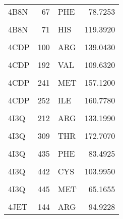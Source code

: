 \begin{table}
\begin{tabular}{lrlr}
			4B8N & 67 & PHE & 78.7253\\
			\cellcolor{gray!6}{4B8N} & \cellcolor{gray!6}{70} & \cellcolor{gray!6}{LEU} & \cellcolor{gray!6}{123.0540}\\
			4B8N & 71 & HIS & 119.3920\\
			\cellcolor{gray!6}{4B8N} & \cellcolor{gray!6}{75} & \cellcolor{gray!6}{VAL} & \cellcolor{gray!6}{149.8530}\\
			\addlinespace
			4CDP & 100 & ARG & 139.0430\\
			\cellcolor{gray!6}{4CDP} & \cellcolor{gray!6}{191} & \cellcolor{gray!6}{ASP} & \cellcolor{gray!6}{101.3160}\\
			4CDP & 192 & VAL & 109.6320\\
			\cellcolor{gray!6}{4CDP} & \cellcolor{gray!6}{193} & \cellcolor{gray!6}{HIS} & \cellcolor{gray!6}{109.7720}\\
			4CDP & 241 & MET & 157.1200\\
			\addlinespace
			\cellcolor{gray!6}{4CDP} & \cellcolor{gray!6}{243} & \cellcolor{gray!6}{PHE} & \cellcolor{gray!6}{125.6670}\\
			4CDP & 252 & ILE & 160.7780\\
			\cellcolor{gray!6}{4CDP} & \cellcolor{gray!6}{90} & \cellcolor{gray!6}{LEU} & \cellcolor{gray!6}{152.7650}\\
			4I3Q & 212 & ARG & 133.1990\\
			\cellcolor{gray!6}{4I3Q} & \cellcolor{gray!6}{305} & \cellcolor{gray!6}{ALA} & \cellcolor{gray!6}{115.6050}\\
			\addlinespace
			4I3Q & 309 & THR & 172.7070\\
			\cellcolor{gray!6}{4I3Q} & \cellcolor{gray!6}{434} & \cellcolor{gray!6}{PRO} & \cellcolor{gray!6}{69.3456}\\
			4I3Q & 435 & PHE & 83.4925\\
			\cellcolor{gray!6}{4I3Q} & \cellcolor{gray!6}{441} & \cellcolor{gray!6}{ASN} & \cellcolor{gray!6}{60.3712}\\
			4I3Q & 442 & CYS & 103.9950\\
			\addlinespace
			\cellcolor{gray!6}{4I3Q} & \cellcolor{gray!6}{443} & \cellcolor{gray!6}{ILE} & \cellcolor{gray!6}{55.5209}\\
			4I3Q & 445 & MET & 65.1655\\
			\cellcolor{gray!6}{4I3Q} & \cellcolor{gray!6}{448} & \cellcolor{gray!6}{ALA} & \cellcolor{gray!6}{146.6870}\\
			4JET & 144 & ARG & 94.9228\\

\end{tabular}
\end{table}
